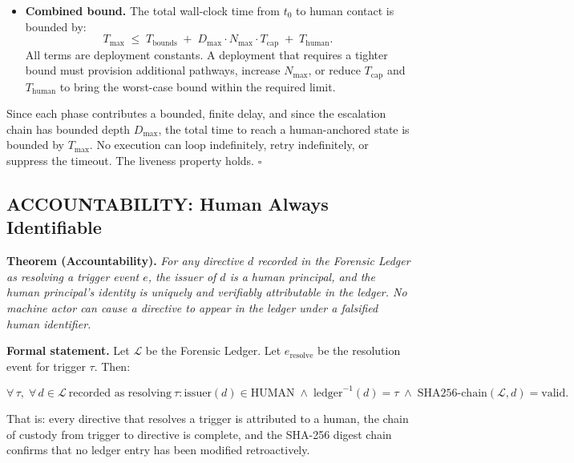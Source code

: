 \begin{itemize}
  \item[$\bullet$] \textbf{Combined bound.}
    The total wall-clock time from $t_0$ to human contact is bounded by:
    \begin{equation}
    \label{eq:t-max}
    T_{\max} \;\leq\; T_{\text{bounds}} \;+\; D_{\max} \cdot N_{\max} \cdot T_{\text{cap}} \;+\; T_{\text{human}}.
    \end{equation}
    All terms are deployment constants. A deployment that requires a tighter bound
    must provision additional pathways, increase $N_{\max}$, or reduce $T_{\text{cap}}$
    and $T_{\text{human}}$ to bring the worst-case bound within the required limit.
\end{itemize}

Since each phase contributes a bounded, finite delay, and since the escalation chain
has bounded depth $D_{\max}$, the total time to reach a human-anchored state is bounded
by $T_{\max}$. No execution can loop indefinitely, retry indefinitely, or suppress the
timeout. The liveness property holds. $\square$

\subsection{ACCOUNTABILITY: Human Always Identifiable}
\label{sec:accountability}

\textbf{Theorem (Accountability).} \emph{For any directive $d$ recorded in the Forensic
Ledger as resolving a trigger event $e$, the issuer of $d$ is a human principal, and the
human principal's identity is uniquely and verifiably attributable in the ledger. No
machine actor can cause a directive to appear in the ledger under a falsified human
identifier.}

\medskip
\noindent\textbf{Formal statement.} Let $\mathcal{L}$ be the Forensic Ledger. Let
$e_{\text{resolve}}$ be the resolution event for trigger $\tau$. Then:

\begin{equation}
\label{eq:accountability}
\forall\, \tau,\; \forall\, d \in \mathcal{L}\ \text{recorded as resolving}\ \tau :
\text{issuer}(d) \in \text{HUMAN} \;\land\;
\text{ledger}^{-1}(d) = \tau \;\land\;
\text{SHA256-chain}(\mathcal{L}, d) = \text{valid}.
\end{equation}

That is: every directive that resolves a trigger is attributed to a human, the chain
of custody from trigger to directive is complete, and the SHA-256 digest chain confirms
that no ledger entry has been modified retroactively.

